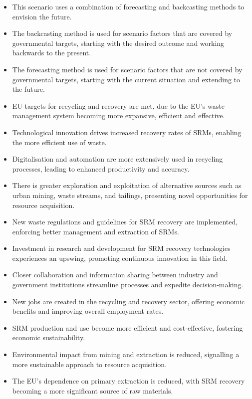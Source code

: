 \begin{itemize}
  \item This scenario uses a combination of forecasting and backcasting methods to envision the future.
  \item The backcasting method is used for scenario factors that are covered by governmental targets, starting with the desired outcome and working backwards to the present.
  \item The forecasting method is used for scenario factors that are not covered by governmental targets, starting with the current situation and extending to the future.
  \item EU targets for recycling and recovery are met, due to the EU's waste management system becoming more expansive, efficient and effective.
  \item Technological innovation drives increased recovery rates of SRMs, enabling the more efficient use of waste.
  \item Digitalisation and automation are more extensively used in recycling processes, leading to enhanced productivity and accuracy.
  \item There is greater exploration and exploitation of alternative sources such as urban mining, waste streams, and tailings, presenting novel opportunities for resource acquisition.
  \item New waste regulations and guidelines for SRM recovery are implemented, enforcing better management and extraction of SRMs.
  \item Investment in research and development for SRM recovery technologies experiences an upswing, promoting continuous innovation in this field.
  \item Closer collaboration and information sharing between industry and government institutions streamline processes and expedite decision-making.
  \item New jobs are created in the recycling and recovery sector, offering economic benefits and improving overall employment rates.
  \item SRM production and use become more efficient and cost-effective, fostering economic sustainability.
  \item Environmental impact from mining and extraction is reduced, signalling a more sustainable approach to resource acquisition.
  \item The EU's dependence on primary extraction is reduced, with SRM recovery becoming a more significant source of raw materials.
\end{itemize}


